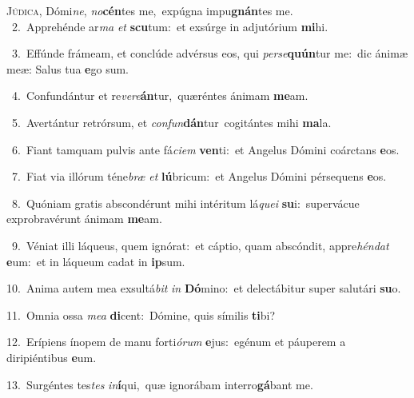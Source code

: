 \lettrine{\initial\textcolor{\initialcolor}{J}}{údica,} Dómi\-\textit{ne}\-, \textit{no}\-\textbf{cén}tes me,~\star expúgna impu\-\textbf{gnán}\-tes me.\\
{\numbfont\textcolor{\numbcolor}{~2.}}~Apprehénde ar\textit{ma} \textit{et} \textbf{scu}\-tum:~\star et exsúrge in adjutórium \textbf{mi}\-hi.\par
{\numbfont\textcolor{\numbcolor}{~3.}}~Effúnde frámeam, et conclúde advérsus eos, qui \textit{per}\-\textit{se}\textbf{quún}tur me:~\star dic ánimæ meæ: Salus tua \textbf{e}\-go sum.\par
{\numbfont\textcolor{\numbcolor}{~4.}}~Confundántur et re\-\textit{ve}\-\textit{re}\textbf{án}tur,~\star quæréntes ánimam \textbf{me}\-am.\par
{\numbfont\textcolor{\numbcolor}{~5.}}~Avertántur retrórsum, et \textit{con}\-\textit{fun}\textbf{dán}tur~\star cogitántes mihi \textbf{ma}\-la.\par
{\numbfont\textcolor{\numbcolor}{~6.}}~Fiant tamquam pulvis ante fá\-\textit{ci}\-\textit{em} \textbf{ven}\-ti:~\star et Angelus Dómini coárctans \textbf{e}\-os.\par
{\numbfont\textcolor{\numbcolor}{~7.}}~Fiat via illórum téne\textit{bræ} \textit{et} \textbf{lú}\-bricum:~\star et Angelus Dómini pérsequens \textbf{e}\-os.\par
{\numbfont\textcolor{\numbcolor}{~8.}}~Quóniam gratis abscondérunt mihi intéritum lá\-\textit{que}\-\textit{i} \textbf{su}\-i:~\star supervácue exprobravérunt ánimam \textbf{me}\-am.\par
{\numbfont\textcolor{\numbcolor}{~9.}}~Véniat illi láqueus, quem ignórat:~\dagger et cáptio, quam abscóndit, appre\-\textit{hén}\-\textit{dat} \textbf{e}\-um:~\star et in láqueum cadat in \textbf{ip}\-sum.\par
{\numbfont\textcolor{\numbcolor}{10.}}~Anima autem mea exsultá\textit{bit} \textit{in} \textbf{Dó}\-mino:~\star et delectábitur super salutári \textbf{su}\-o.\par
{\numbfont\textcolor{\numbcolor}{11.}}~Omnia ossa \textit{me}\-\textit{a} \textbf{di}\-cent:~\star Dómine, quis símilis \textbf{ti}\-bi?\par
{\numbfont\textcolor{\numbcolor}{12.}}~Erípiens ínopem de manu forti\-\textit{ó}\-\textit{rum} \textbf{e}\-jus:~\star egénum et páuperem a diripiéntibus \textbf{e}\-um.\par
{\numbfont\textcolor{\numbcolor}{13.}}~Surgéntes tes\textit{tes} \textit{in}\-\textbf{í}qui,~\star quæ ignorábam interro\-\textbf{gá}\-bant me.\par
